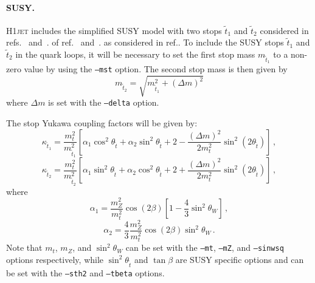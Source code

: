 \documentclass[12pt]{article}
\begin{document}
\paragraph{SUSY.} \textsc{H1jet} includes the simplified SUSY model with
two stops $\tilde{t}_1$ and $\tilde{t}_2$ considered in refs.~\cite{Gunion:2002zf} and~\cite{Banfi:2018pki}.  of ref.~\cite{Gunion:2002zf} and~\cite{Banfi:2018pki}. as considered in
ref.\cite{Banfi:2018pki}. To include the SUSY stops $\tilde{t}_1$ and
$\tilde{t}_2$ in the quark loops, it will be necessary to set the
first stop mass $m_{\tilde{t}_1}$ to a non-zero value by using the
\texttt{--mst} option. The second stop mass is then given by
\begin{equation}
	m_{\tilde{t}_2} = \sqrt{m_{\tilde{t}_1}^2 + (\Delta m)^2} 
\end{equation}
where $\Delta m$ is set with the \texttt{--delta} option. 

The stop Yukawa coupling factors will be given by: 
\begin{equation}
   \kappa_{\tilde{t}_1} = \frac{m_t^2}{m_{\tilde{t}_1}^2} \left [ \alpha_1 \cos^2 \theta_{\tilde{t}} + \alpha_2 \sin^2 \theta_{\tilde{t}} + 2 - \frac{(\Delta m)^2}{2 m_t^2} \sin^2\left ( 2 \theta_{\tilde{t}} \right ) \right ] \,,
\end{equation} 
\begin{equation}
   \kappa_{\tilde{t}_2} = \frac{m_t^2}{m_{\tilde{t}_2}^2} \left [ \alpha_1 \sin^2 \theta_{\tilde{t}} + \alpha_2 \cos^2 \theta_{\tilde{t}} + 2 + \frac{(\Delta m)^2}{2 m_t^2} \sin^2\left ( 2 \theta_{\tilde{t}} \right ) \right ] \,, 
\end{equation} 
where 
\begin{equation}
   \alpha_1 = \frac{m_Z^2}{m_t^2} \cos \left ( 2 \beta \right ) \left [ 1 - \frac{4}{3} \sin^2\theta_W \right ] \,, 
\end{equation} 
\begin{equation}
   \alpha_2 = \frac{4}{3} \frac{m_Z^2}{m_t^2} \cos \left ( 2 \beta \right ) \sin^2\theta_W \,. 
\end{equation} 
Note that $m_t$, $m_Z$, and $\sin^2\theta_W$ can be set with the \texttt{--mt}, \texttt{--mZ}, and \texttt{--sinwsq} options respectively, while $\sin^2 \theta_{\tilde{t}}$ and $\tan\beta$ are SUSY specific options and can be set with the \texttt{--sth2} and \texttt{--tbeta} options. 
\end{document}
